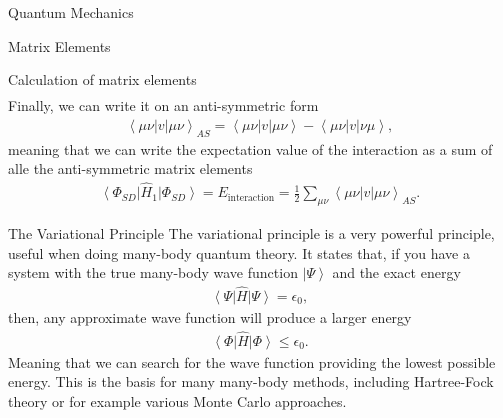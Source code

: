 \documentclass[twoside,english]{uiofysmaster}
\begin{document}
\begin{chapter}{Quantum Mechanics}
\begin{section}{Matrix Elements}
\begin{subsection}{Calculation of matrix elements}
\begin{align}
			\end{align}
			Finally, we can write it on an anti-symmetric form
			\begin{align}
				\left< \mu \nu | v | \mu \nu \right>_{AS} = \left< \mu \nu | v | \mu \nu \right> - \left< \mu \nu | v | \nu \mu \right>,
			\end{align}
			meaning that we can write the expectation value of the interaction as a sum of alle the anti-symmetric matrix elements
			\begin{align}
				\left< \Phi_{SD} \right| \hat H_1 \left| \Phi_{SD} \right> = E_{\text{interaction}} = \frac{1}{2} \sum_{\mu \nu} \left< \mu \nu | v | \mu \nu \right>_{AS}.
 			\end{align}
		\end{subsection}
	\end{section}

	\begin{section}{The Variational Principle}
		The variational principle is a very powerful principle, useful when doing many-body quantum theory. It states that, if you have a system with the true many-body wave function $\left| \Psi \right>$ and the exact energy
		\begin{align}
			\left< \Psi \right| \hat H \left| \Psi \right> = \epsilon_0,
		\end{align}
		then, any approximate wave function will produce a larger energy \cite{Szabo}
		\begin{align}
			\left< \Phi \right| \hat H \left| \Phi \right> \leq \epsilon_0.
		\end{align}
		Meaning that we can search for the wave function providing the lowest possible energy. This is the basis for many many-body methods, including Hartree-Fock theory or for example various Monte Carlo approaches. 
	\end{section}

\end{chapter}
\end{document}
